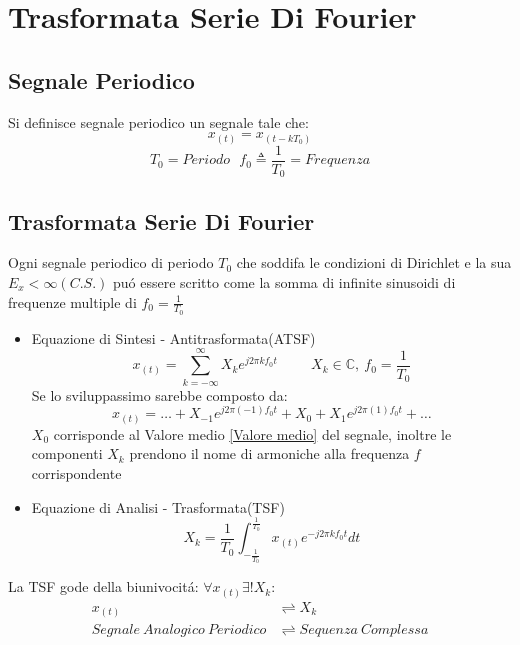 \section{Trasformata Serie Di Fourier}
    \subsection{Segnale Periodico}
        Si definisce segnale periodico un segnale tale che:
        \[
            x_{(t)} = x_{(t-kT_0)}    
        \]
        \[
            T_0=Periodo\ \ \ f_0\triangleq \frac{1}{T_0} =Frequenza
        \]
    \subsection{Trasformata Serie Di Fourier}
        Ogni segnale periodico di periodo $T_0$ che soddifa le condizioni di Dirichlet e la sua $E_x < \infty (C.S.)$ puó essere scritto come la somma di 
        infinite sinusoidi di frequenze multiple di $f_0 = \frac{1}{T_0}$
        \begin{itemize}
            \item{Equazione di Sintesi - Antitrasformata(ATSF)\label{ATSF}
                \[
                    x_{(t)} = \sum_{k = -\infty}^{\infty} X_{k} e^{j2\pi kf_0t} \hspace{1cm} X_{k}\in \mathbb{C},\ f_0 = \frac{1}{T_0} 
                \]
                Se lo sviluppassimo sarebbe composto da:
                \[
                   x_{(t)} =\ldots  + X_{-1} e^{j2\pi (-1)f_0t} + X_{0} + X_{1} e^{j2\pi (1) f_0t} + \ldots 
                \]
                $X_0$ corrisponde al Valore medio \ref{Valore medio} del segnale, inoltre le componenti $X_k$ prendono il nome di armoniche alla frequenza $f$ corrispondente
            }
            \item{Equazione di Analisi - Trasformata(TSF)\label{TSF}
                \[
                    X_k =\frac{1}{T_0}\int_{-\frac{1}{T_0}}^{\frac{1}{T_0}} x_{(t)} e^{-j2\pi kf_0t} dt
                \]
            } 
        \end{itemize}
        La TSF gode della biunivocitá: $\forall x_{(t)} \exists! X_k$:
        \begin{align}
            x_{(t)} & \rightleftharpoons X_k  \nonumber\\
            Segnale\ Analogico\ Periodico &\rightleftharpoons Sequenza\ Complessa \nonumber
        \end{align}
